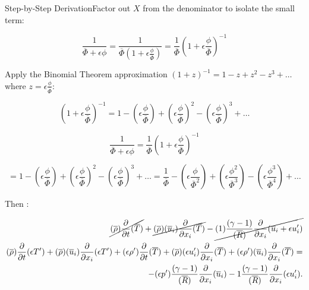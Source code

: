 Step-by-Step
DerivationFactor out \(X\) from the denominator to isolate the small
term:

\begin{equation*}
\frac{1}{\overline{\Phi}+\epsilon \phi}
=
\frac{1}{\overline{\Phi}\left(1+\epsilon
\frac{\phi}{\overline{\Phi}}\right)}
=
\frac{1}{\overline{\Phi}}
\left(1+\epsilon \frac{\phi}{\overline{\Phi}}\right)^{-1}
\end{equation*}

Apply
the Binomial Theorem approximation \((1 + z)^{-1} = 1 - z + z^2 - z^3 + \dots\)
where \(z = \epsilon \frac{\phi}{\overline{\Phi}}\):

\begin{equation*}
\left(1+\epsilon \frac{\phi}{\overline{\Phi}}\right)^{-1}
=
1
-
\left(\epsilon
\frac{\phi}{\overline{\Phi}}\right)
+
\left(\epsilon \frac{\phi}{\overline{\Phi}}\right)^{2}
-
\left(\epsilon
\frac{\phi}{\overline{\Phi}}\right)^{3}+\dots 
\end{equation*}

\begin{equation*}
\frac{1}{\overline{\Phi}+\epsilon \phi}
=
\frac{1}{\overline{\Phi}}
\left(1+\epsilon \frac{\phi}{\overline{\Phi}}\right)^{-1}
\end{equation*}

\begin{equation*}
=
1
-
\left(\epsilon
\frac{\phi}{\overline{\Phi}}\right)
+
\left(\epsilon \frac{\phi}{\overline{\Phi}}\right)^{2}
-
\left(\epsilon
\frac{\phi}{\overline{\Phi}}\right)^{3}+\dots 
=
\frac{1}{\overline{\Phi}}
-
\left(\epsilon \frac{\phi}{\overline{\Phi}^2}\right)
+
\left(\epsilon \frac{\phi^{2}}{\overline{\Phi}^3}\right)
-
\left(\epsilon
\frac{\phi^{3}}{\overline{\Phi}^4}\right)+\dots 
\end{equation*}

Then :

\begin{equation*}
\begin{split}
\cancel{
(\overline{\rho})
\frac{\partial  }{\partial  t}
(\overline{T})
}
+
\cancel{
(\overline{\rho})
(\overline{u}_i) 
\frac{\partial }{\partial x_i} 
(\overline{T})
}
-
\cancel{
(1)
\frac{(\gamma-1)}{
(\overline{R})
}
\frac{\partial}{\partial x_i} 
(\overline{u}_i+\epsilon u_i^{\prime}) 
}
\\
(\overline{\rho})
\frac{\partial  }{\partial  t}
(\epsilon T^{\prime})
+
(\overline{\rho})
(\overline{u}_i) 
\frac{\partial }{\partial x_i} 
(\epsilon T^{\prime})
+
(\epsilon \rho^{\prime})
\frac{\partial  }{\partial  t}
(\overline{T})
+
(\overline{\rho})
(\epsilon u_i^{\prime}) 
\frac{\partial }{\partial x_i} 
(\overline{T})
+
(\epsilon \rho^{\prime})
(\overline{u}_i) 
\frac{\partial }{\partial x_i} 
(\overline{T})
= 
\\
-
(\epsilon p^{\prime})
\frac{(\gamma-1)}{
(\overline{R})
}
\frac{\partial}{\partial x_i} 
(\overline{u}_i) 
-
1
\frac{(\gamma-1)}{
(\overline{R})
}
\frac{\partial}{\partial x_i} 
(\epsilon u^\prime_i) 
.
\end{split}
\end{equation*} 

